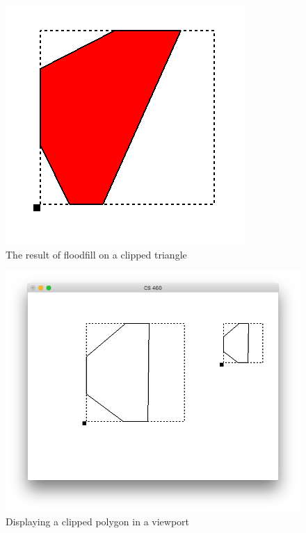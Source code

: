 \documentclass{article}
\begin{document}
\begin{figure}[htb]
\centering
\includegraphics[width=.9\linewidth]{./img/floodfill.png}
\caption{The result of floodfill on a clipped triangle}
\end{figure}
\begin{figure}[htb]
\centering
\includegraphics[width=.9\linewidth]{./img/viewport.png}
\caption{Displaying a clipped polygon in a viewport}
\end{figure}
\end{document}
